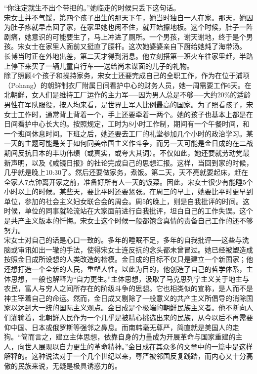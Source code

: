 “你注定就生不出个带把的。”她临走的时候只丢下这句话。\\

宋女士并不气馁，第四个孩子出生的那天下午，她当时独自一人在家。那天，她因为肚子疼就早点回了家，在家里她也闲不住，就开始擦地板。这个时候，肚子一阵剧痛，她意识的可能要生了，马上冲进了厕所。一个男孩，谢天谢地，终于是个男孩。宋女士在家里人面前又挺直了腰杆。这次她婆婆亲自下厨给她炖了海带汤。\\

长博当时正在外地出差，第二天才得到消息。他立刻搭第一班火车往家里赶，半路上停下来买了一辆儿童自行车──送给尚未谋面的儿子的礼物。\\

除了照顾4个孩子和操持家务，宋女士还要完成自己的全职工作，作为在位于浦项（Pohang）的朝鲜制衣厂附属日间看护中心的财务人员，她一周需要工作6天。在北朝鲜，女人们是维持工厂运作的主力军──因为男人总是不够──大约20\%的适龄男性在军队服役，按人均来看，是世界上军人比例最高的国家。为了照看孩子，宋女士工作时，通常背上背着一个，手上还要牵着一两个。她的孩子也基本上都是在日间看护中心长大的。按照规定，工时为8小时工作制，期间有一个午餐时间，和一个班间休息时间。下班之后，她还要去工厂的礼堂参加几个小时的政治学习。某一天的主题可能是关于如何同美帝国主义作斗争，而另一天可能是金日成的在二战期间反抗日本的丰功伟绩（或真实，或夸大其词）。不仅如此，她还要就劳动党最新声明，以及《咸镜日报》的社论完成自己的思想汇报。这样，当回到家的时候，几乎就是晚上10:30了。然后还要做家务，煮饭。第二天，天不亮就要起床，赶在全家人7点钟离开家之前，准备好所有人一天的饭菜。因此，宋女士很少有能睡5个小时以上的时候。某些天，要比平时还要紧张。在周三的早上，她要比平时更早到单位，参加的社会主义妇女联合会的周会。周5的晚上，则是自我批评的时间。这时候，单位的同事就轮流站在大家面前进行自我批评，坦白自己的工作失误。这个是共产主义版本的忏悔。宋女士这个时候一般都饱含真情的责备自己工作的还不够努力。\\

宋女士对自己的话是心口一致的。多年的睡眠不足，多年的自我批评──这些与洗脑或审讯如出一辙的手法，使得宋女士连反抗的念头都未曾冒过。她已经被塑造成按照金日成所设想的人类改造的楷模。金日成的目标不仅只是建立一个新国家；他还想打造一个全新的人民，重塑人性。以此为目的，他创造了自己的哲学体系，主体思想，一般也解释为“自力更生。”主体思想，汲取了马克思列宁主义关于地主与农民，富人与穷人之间所存在的阶级斗争的思想。它也相类似的宣称，是人而不是神主宰着自己的命运。然而，金日成又剔除了一般意义的共产主义所倡导的消除国家以达到大一统的国际主义观点。金日成是个极端的朝鲜民族主义者。他不断向人们灌输着，北朝鲜人民作为一个几乎是被精心挑选出来的民族，从今以后不再需要仰中国、日本或俄罗斯等强邻之鼻息。而南韩毫无尊严，简直就是美国人的走狗。“简而言之，建立主体思想，依靠自身的力量成为开展革命与国家重建的主人，向世人展现以自力更生的革命精神。”金日成在其众多的文章中的一篇中是这样解释的。这种说法对于一个几个世纪以来，尊严被邻国反复践踏，而内心又十分高傲的民族来说，无疑是极具诱惑力的。\\

